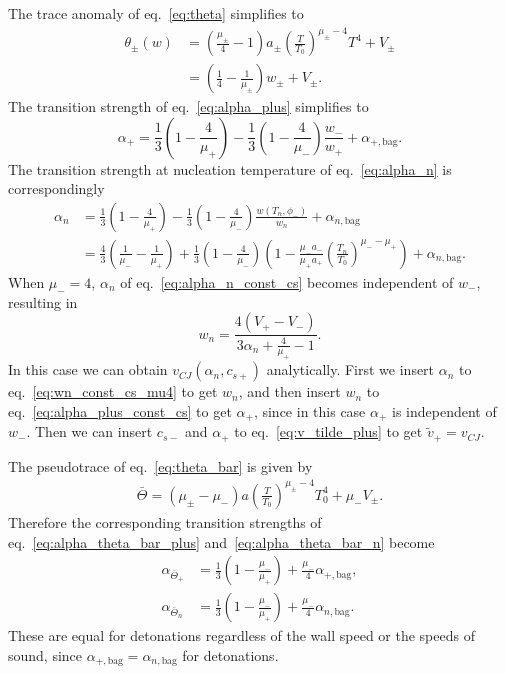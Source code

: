 The trace anomaly of eq.~\eqref{eq:theta} simplifies to
\begin{align}
\theta_\pm(w)
&= \left( \frac{\mu_\pm}{4} - 1 \right) a_\pm \left( \frac{T}{T_0} \right)^{\mu_\pm - 4} T^4 + V_\pm \\
&= \left( \frac{1}{4} - \frac{1}{\mu_\pm} \right) w_\pm + V_\pm.
\label{eq:theta_const_cs}
\end{align}
The transition strength of eq.~\eqref{eq:alpha_plus} simplifies to
\begin{equation}
\alpha_+ = \frac{1}{3} \left( 1 - \frac{4}{\mu_+} \right) - \frac{1}{3} \left(1 - \frac{4}{\mu_-} \right) \frac{w_-}{w_+} + \alpha_{+,\text{bag}}.
\label{eq:alpha_plus_const_cs}
\end{equation}
The transition strength at nucleation temperature of eq.~\eqref{eq:alpha_n} is correspondingly
\begin{align}
\alpha_n &= \frac{1}{3} \left( 1 - \frac{4}{\mu_+} \right) - \frac{1}{3} \left(1 - \frac{4}{\mu_-} \right) \frac{w(T_n, \phi_-)}{w_n} + \alpha_{n,\text{bag}} \\
&= \frac{4}{3} \left( \frac{1}{\mu_-} - \frac{1}{\mu_+} \right) + \frac{1}{3} \left( 1 - \frac{4}{\mu_-} \right)
\left( 1 - \frac{\mu_- a_-}{\mu_+ a_+} \left( \frac{T_n}{T_0} \right)^{\mu_- - \mu_+} \right) + \alpha_{n,\text{bag}}.
\label{eq:alpha_n_const_cs}
\end{align}
When $\mu_- = 4$, $\alpha_n$ of eq.~\eqref{eq:alpha_n_const_cs} becomes independent of $w_-$, resulting in
\begin{equation}
w_n = \frac{4 (V_+ - V_-)}{3 \alpha_n + \frac{4}{\mu_+} - 1}.
\label{eq:wn_const_cs_mu4}
\end{equation}
In this case we can obtain $v_{CJ}(\alpha_n, c_{s+})$ analytically.
First we insert $\alpha_n$ to eq.~\eqref{eq:wn_const_cs_mu4} to get $w_n$,
and then insert $w_n$ to eq.~\eqref{eq:alpha_plus_const_cs} to get $\alpha_+$,
since in this case $\alpha_+$ is independent of $w_-$.
Then we can insert $c_{s-}$ and $\alpha_+$ to eq.~\eqref{eq:v_tilde_plus} to get $\tilde{v}_+ = v_{CJ}$.

The pseudotrace of eq.~\eqref{eq:theta_bar} is given by
\begin{align}
\bar{\Theta} = (\mu_\pm - \mu_-) a \left(\frac{T}{T_0}\right)^{\mu_\pm - 4} T_0^4 + \mu_- V_\pm.
\end{align}
Therefore the corresponding transition strengths of eq.~\eqref{eq:alpha_theta_bar_plus} and~\eqref{eq:alpha_theta_bar_n} become
\begin{align}
\alpha_{\bar{\Theta}_+} &= \frac{1}{3} \left(1 - \frac{\mu_-}{\mu_+}\right) + \frac{\mu_-}{4} \alpha_{+,\text{bag}}, \\
\alpha_{\bar{\Theta}_n} &= \frac{1}{3} \left(1 - \frac{\mu_-}{\mu_+}\right) + \frac{\mu_-}{4} \alpha_{n,\text{bag}}.
\end{align}
These are equal for detonations regardless of the wall speed or the speeds of sound,
since $\alpha_{+,\text{bag}} = \alpha_{n,\text{bag}}$ for detonations.

